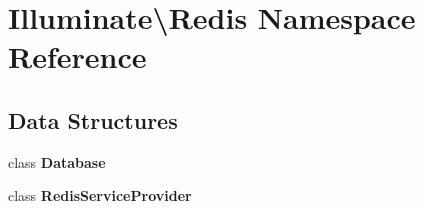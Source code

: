 \section{Illuminate\textbackslash{}Redis Namespace Reference}
\label{namespace_illuminate_1_1_redis}
\subsection*{Data Structures}
\begin{DoxyCompactItemize}
\item 
class {\bf Database}
\item 
class {\bf Redis\+Service\+Provider}
\end{DoxyCompactItemize}
